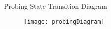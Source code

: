 \begin{frame}{Probing State Transition Diagram}
    \begin{figure}
        \centering\texttt{[image: probingDiagram]}
    \end{figure}
\end{frame}

